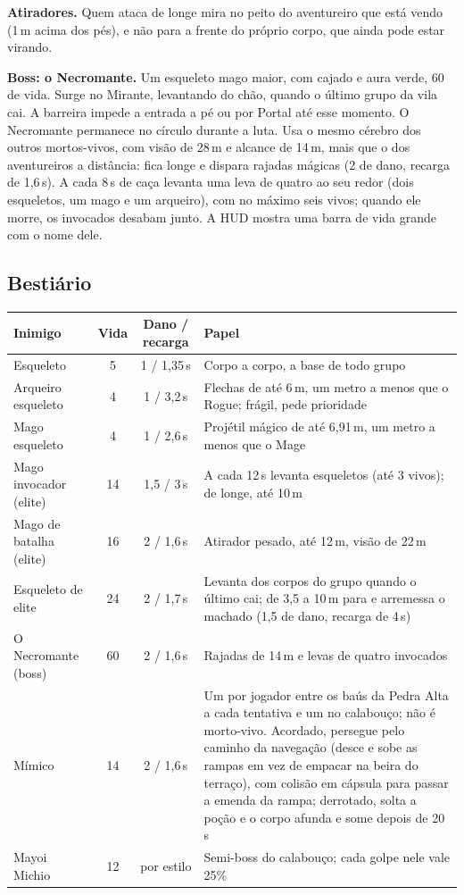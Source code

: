 \documentclass[11pt,a4paper]{article}
\begin{document}
\textbf{Atiradores.} Quem ataca de longe mira no peito do aventureiro que está vendo (1\,m acima dos pés), e não para a frente do próprio corpo, que ainda pode estar virando.

\textbf{Boss: o Necromante.} Um esqueleto mago maior, com cajado e aura verde, 60 de vida. Surge no Mirante, levantando do chão, quando o último grupo da vila cai. A barreira impede a entrada a pé ou por Portal até esse momento. O Necromante permanece no círculo durante a luta. Usa o mesmo cérebro dos outros mortos-vivos, com visão de 28\,m e alcance de 14\,m, mais que o dos aventureiros a distância: fica longe e dispara rajadas mágicas (2 de dano, recarga de 1,6\,s). A cada 8\,s de caça levanta uma leva de quatro ao seu redor (dois esqueletos, um mago e um arqueiro), com no máximo seis vivos; quando ele morre, os invocados desabam junto. A HUD mostra uma barra de vida grande com o nome dele.

\subsection{Bestiário}
\label{sec:bestiario}

\begin{xltabular}{\textwidth}{@{}lccX@{}}
\toprule
\textbf{Inimigo} & \textbf{Vida} & \textbf{Dano / recarga} & \textbf{Papel} \\
\midrule
Esqueleto & 5 & 1 / 1,35\,s & Corpo a corpo, a base de todo grupo \\
Arqueiro esqueleto & 4 & 1 / 3,2\,s & Flechas de até 6\,m, um metro a menos que o Rogue; frágil, pede prioridade \\
Mago esqueleto & 4 & 1 / 2,6\,s & Projétil mágico de até 6,91\,m, um metro a menos que o Mage \\
Mago invocador (elite) & 14 & 1,5 / 3\,s & A cada 12\,s levanta esqueletos (até 3 vivos); de longe, até 10\,m \\
Mago de batalha (elite) & 16 & 2 / 1,6\,s & Atirador pesado, até 12\,m, visão de 22\,m \\
Esqueleto de elite & 24 & 2 / 1,7\,s & Levanta dos corpos do grupo quando o último cai; de 3,5 a 10\,m para e arremessa o machado (1,5 de dano, recarga de 4\,s) \\
O Necromante (boss) & 60 & 2 / 1,6\,s & Rajadas de 14\,m e levas de quatro invocados \\
Mímico & 14 & 2 / 1,6\,s & Um por jogador entre os baús da Pedra Alta a cada tentativa e um no calabouço; não é morto-vivo. Acordado, persegue pelo caminho da navegação (desce e sobe as rampas em vez de empacar na beira do terraço), com colisão em cápsula para passar a emenda da rampa; derrotado, solta a poção e o corpo afunda e some depois de 20\,s \\
Mayoi Michio & 12 & por estilo & Semi-boss do calabouço; cada golpe nele vale 25\% \\
\bottomrule
\end{xltabular}
\end{document}

